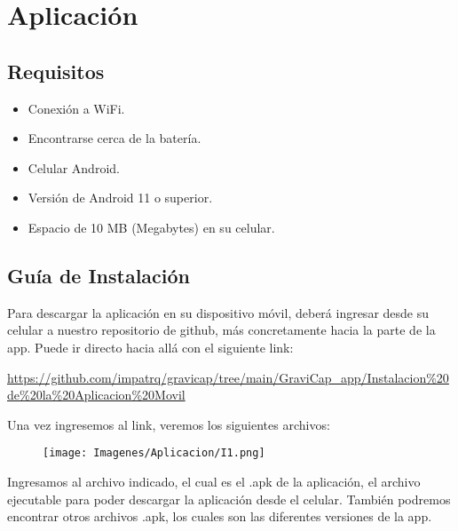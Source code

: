 \chapter{Aplicación}
    \section{Requisitos}
        \begin{itemize}
            \item Conexión a WiFi.
            \item Encontrarse cerca de la batería.
            \item Celular Android.
            \item Versión de Android 11 o superior.
            \item Espacio de 10 MB (Megabytes) en su celular.
        \end{itemize}

    \section{Guía de Instalación}
       Para descargar la aplicación en su dispositivo móvil, deberá ingresar desde su celular a nuestro repositorio de github, más concretamente hacia la parte de la app. Puede ir directo hacia allá con el siguiente link:\par
       
       \vspace{0.5cm}
       
       \begin{center}
           \href{https://github.com/impatrq/gravicap/tree/main/GraviCap_app/Instalacion%20de%20la%20Aplicacion%20Movil}{https://github.com/impatrq/gravicap/tree/main/GraviCap\_app/Instalacion\%20de\%20la\%20Aplicacion\%20Movil}\par
       \end{center}

        \vspace{0.5cm}
        
        Una vez ingresemos al link, veremos los siguientes archivos:\par
        
        \begin{figure} [H]
            \centering
            \texttt{[image: Imagenes/Aplicacion/I1.png]}
        \end{figure}
        
        Ingresamos al archivo indicado, el cual es el .apk de la aplicación, el archivo ejecutable para poder descargar la aplicación desde el celular. También podremos encontrar otros archivos .apk, los cuales son las diferentes versiones de la app.\par

